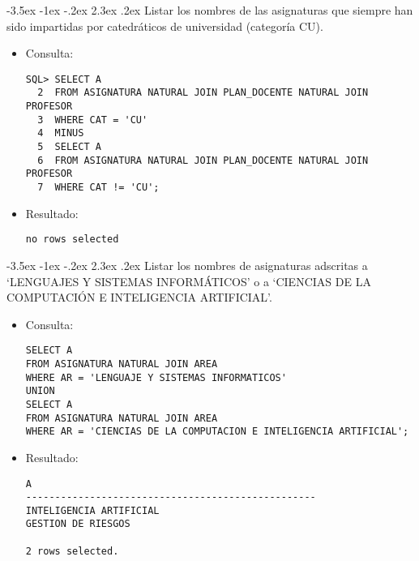 \documentclass[11pt]{report}
\makeatletter
\renewcommand\chapter{\@startsection{chapter}{0}{\z@}%
    {-3.5ex \@plus -1ex \@minus -.2ex}%
    {2.3ex \@plus.2ex}%
    {\normalfont\Large\bfseries}}
\makeatother
\begin{document}
\chapter{Listar los nombres de las asignaturas que siempre han sido impartidas por catedráticos de universidad (categoría CU).}
\begin{itemize}
  \item Consulta:
  \begin{verbatim}
SQL> SELECT A
  2  FROM ASIGNATURA NATURAL JOIN PLAN_DOCENTE NATURAL JOIN PROFESOR
  3  WHERE CAT = 'CU'
  4  MINUS
  5  SELECT A
  6  FROM ASIGNATURA NATURAL JOIN PLAN_DOCENTE NATURAL JOIN PROFESOR
  7  WHERE CAT != 'CU';
  \end{verbatim}
  \item{Resultado:}
  \begin{verbatim}
no rows selected
  \end{verbatim}
\end{itemize}

\chapter{Listar los nombres de asignaturas adscritas a ‘LENGUAJES Y SISTEMAS INFORMÁTICOS’ o a ‘CIENCIAS DE LA COMPUTACIÓN E INTELIGENCIA ARTIFICIAL’.}
\begin{itemize}
  \item Consulta:
  \begin{verbatim}
SELECT A
FROM ASIGNATURA NATURAL JOIN AREA
WHERE AR = 'LENGUAJE Y SISTEMAS INFORMATICOS'
UNION
SELECT A
FROM ASIGNATURA NATURAL JOIN AREA
WHERE AR = 'CIENCIAS DE LA COMPUTACION E INTELIGENCIA ARTIFICIAL';
  \end{verbatim}
  \item{Resultado:}
  \begin{verbatim}
A
--------------------------------------------------
INTELIGENCIA ARTIFICIAL
GESTION DE RIESGOS

2 rows selected.
  \end{verbatim}
\end{itemize}

\end{document}
